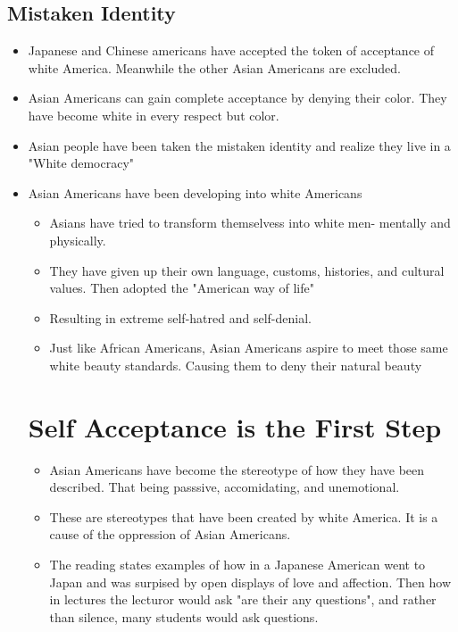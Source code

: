 \documentclass{article}
\begin{document}
\subsection{Mistaken Identity}
\begin{itemize}
  \item Japanese and Chinese americans have accepted
    the token of acceptance of white America.
    Meanwhile the other Asian Americans are excluded.
  \item Asian Americans can gain complete
    acceptance by denying their color.
    They have become white in every respect but color.
  \item Asian people have been taken the mistaken identity
    and realize they live in a "White democracy"
  \item Asian Americans have been developing into 
    white Americans
    \begin{itemize}
      \item Asians have tried to transform themselvess into white men-
        mentally and physically.
      \item They have given up their own language,
        customs, histories, and cultural values. Then
        adopted the "American way of life"
      \item Resulting in extreme self-hatred and self-denial.
      \item Just like African Americans, Asian Americans
        aspire to meet those same white beauty standards.
        Causing them to deny their natural beauty
    \end{itemize}

    \section*{Self Acceptance is the First Step}
    \begin{itemize}
      \item Asian Americans have become the stereotype
        of how they have been described.
        That being passsive, accomidating, 
        and unemotional.
      \item These are stereotypes that have been
        created by white America.
        It is a cause of the oppression of Asian Americans.
      \item The reading states examples of how in a Japanese American
        went to Japan and was surpised by open displays
        of love and affection.
        Then how in lectures the lecturor would ask
        "are their any questions", and rather than 
        silence, many students would ask questions.
    \end{itemize}


\end{itemize}
\end{document}
